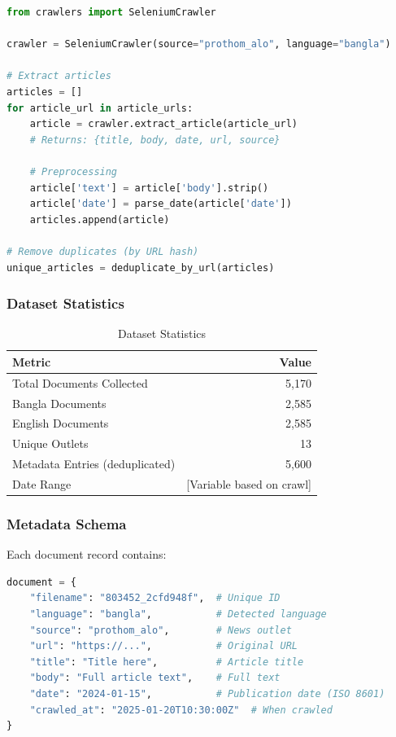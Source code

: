 \documentclass[12pt,a4paper]{report}
\begin{document}
\begin{lstlisting}[language=Python, caption=Article Extraction Pipeline]
from crawlers import SeleniumCrawler

crawler = SeleniumCrawler(source="prothom_alo", language="bangla")

# Extract articles
articles = []
for article_url in article_urls:
    article = crawler.extract_article(article_url)
    # Returns: {title, body, date, url, source}
    
    # Preprocessing
    article['text'] = article['body'].strip()
    article['date'] = parse_date(article['date'])
    articles.append(article)

# Remove duplicates (by URL hash)
unique_articles = deduplicate_by_url(articles)
\end{lstlisting}

\subsubsection{Dataset Statistics}

\begin{table}[H]
    \centering
    \begin{tabular}{|l|r|}
        \hline
        \textbf{Metric} & \textbf{Value} \\
        \hline
        Total Documents Collected & 5,170 \\
        Bangla Documents & 2,585 \\
        English Documents & 2,585 \\
        Unique Outlets & 13 \\
        Metadata Entries (deduplicated) & 5,600 \\
        Date Range & [Variable based on crawl] \\
        \hline
    \end{tabular}
    \caption{Dataset Statistics}
\end{table}

\subsubsection{Metadata Schema}

Each document record contains:

\begin{lstlisting}[language=Python, caption=Document Metadata Structure]
document = {
    "filename": "803452_2cfd948f",  # Unique ID
    "language": "bangla",           # Detected language
    "source": "prothom_alo",        # News outlet
    "url": "https://...",           # Original URL
    "title": "Title here",          # Article title
    "body": "Full article text",    # Full text
    "date": "2024-01-15",           # Publication date (ISO 8601)
    "crawled_at": "2025-01-20T10:30:00Z"  # When crawled
}
\end{lstlisting}
\end{document}
